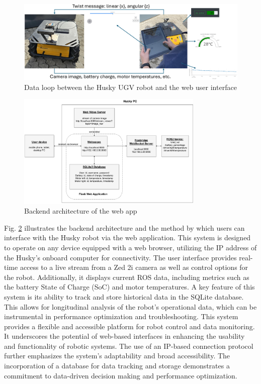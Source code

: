 \documentclass[conference]{IEEEtran}
\begin{document}
\begin{figure}[htbp]
    \centerline{\includegraphics[width=18.2cm]{Pictures/loop.png}}
    \caption{Data loop between the Husky UGV robot and the web user interface}
    \label{fig:loop}
\end{figure}

\begin{figure}[htbp]
    \centerline{\includegraphics[width=8.9cm]{Pictures/userappbig.pdf}}
    \caption{Backend architecture of the web app}
    \label{fig:userapp}
\end{figure}
Fig. \ref{fig:userapp} illustrates the backend architecture and the method by which users can interface with the Husky robot via the web application. This system is designed to operate on any device equipped with a web browser, utilizing the IP address of the Husky's onboard computer for connectivity.
The user interface provides real-time access to a live stream from a Zed 2i camera as well as control options for the robot. Additionally, it displays current ROS data, including metrics such as the battery State of Charge (SoC) and motor temperatures.
A key feature of this system is its ability to track and store historical data in the SQLite database. This allows for longitudinal analysis of the robot's operational data, which can be instrumental in performance optimization and troubleshooting.
This system provides a flexible and accessible platform for robot control and data monitoring. It underscores the potential of web-based interfaces in enhancing the usability and functionality of robotic systems. 
The use of an IP-based connection protocol further emphasizes the system's adaptability and broad accessibility. The incorporation of a database for data tracking and storage demonstrates a commitment to data-driven decision making and performance optimization. 
\end{document}
